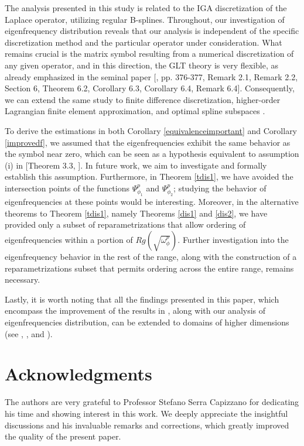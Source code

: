 \documentclass[11pt]{article}
\begin{document}
The analysis presented in this study is related to the IGA discretization of the Laplace operator, utilizing regular B-splines. Throughout, our investigation of eigenfrequency distribution reveals that our analysis is independent of the specific discretization method and the particular operator under consideration. What remains crucial is the matrix symbol resulting from a numerical discretization of any given operator, and in this direction, the GLT theory is very flexible,  as already emphasized in the seminal paper [\cite{capizzano2003generalized}, pp. 376-377, Remark 2.1, Remark 2.2, Section 6, Theorem 6.2, Corollary 6.3, Corollary 6.4, Remark 6.4]. Consequently, we can extend the same study to finite difference discretization, higher-order Lagrangian finite element approximation, and optimal spline subspaces \cite{manni2022application}.

To derive the estimations in both Corollary \ref{equivalenceimportant} and Corollary \ref{improvedf}, we assumed that the eigenfrequencies exhibit the same behavior as the symbol near zero, which can be seen as a hypothesis equivalent to assumption (i) in [Theorem 3.3, \cite{bianchi2021analysis}]. In future work, we aim to investigate and formally establish this assumption. Furthermore, in Theorem \ref{tdis1}, we have avoided the intersection points of the functions $\Psi^p_{\phi_1}$ and $\Psi^p_{\phi_2}$; studying the behavior of eigenfrequencies at these points would be interesting. Moreover, in the alternative theorems to Theorem \ref{tdis1}, namely Theorems \ref{dis1} and \ref{dis2}, we have provided only a subset of reparametrizations that allow ordering of eigenfrequencies within a portion of $Rg\left(\sqrt{\omega^p_{\phi}}\right)$.  Further investigation into the eigenfrequency behavior in the rest of the range, along with the construction of a reparametrizations subset that permits ordering across the entire range, remains necessary.

Lastly, it is worth noting that all the findings presented in this paper, which encompass the improvement of the results in \cite{bianchi2021analysis}, along with our analysis of eigenfrequencies distribution, can be extended to domains of higher dimensions (see \cite{serra2006glt}, \cite{barbarino2020block},  and \cite{garoni2017generalized2}).


\section*{Acknowledgments}
The authors are very grateful to Professor Stefano Serra Capizzano for dedicating his time and showing interest in this work. We deeply appreciate the insightful discussions and his invaluable remarks and corrections, which greatly improved the quality of the present paper.
\end{document}
